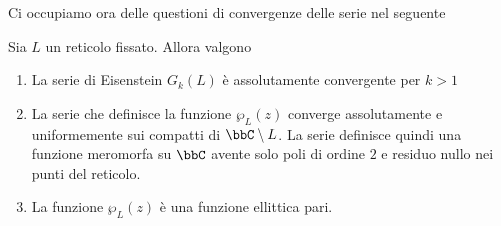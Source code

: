Ci occupiamo ora delle questioni di convergenze delle serie nel seguente
\begin{teorema}
    Sia $L$ un reticolo fissato. Allora valgono
    \begin{enumerate}
        \item La serie di Eisenstein $G_k(L)$ è assolutamente convergente per $k>1$
        \item La serie che definisce la funzione $\wp_L(z)$ converge assolutamente e uniformemente sui compatti di $\bbC\setminus L$. La serie definisce quindi una funzione meromorfa su $\bbC$ avente solo poli di ordine $2$ e residuo nullo nei punti del reticolo.
        \item La funzione $\wp_L(z)$ è una funzione ellittica pari.
    \end{enumerate}
\end{teorema}
